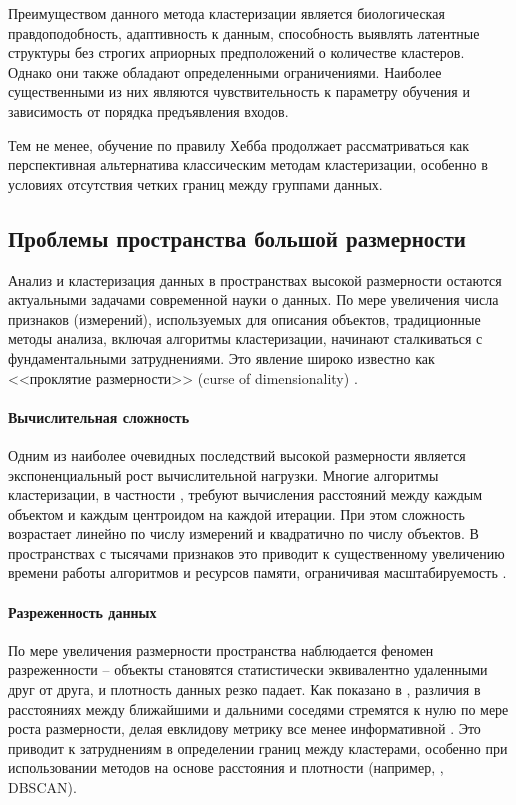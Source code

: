         Преимуществом данного метода кластеризации является биологическая правдоподобность, адаптивность к данным, способность выявлять латентные структуры без строгих априорных предположений о количестве кластеров. Однако они также обладают определенными ограничениями. Наиболее существенными из них являются чувствительность к параметру обучения и зависимость от порядка предъявления входов.

        Тем не менее, обучение по правилу Хебба продолжает рассматриваться как перспективная альтернатива классическим методам кластеризации, особенно в условиях отсутствия четких границ между группами данных.


    \subsection{Проблемы пространства большой размерности}
        Анализ и кластеризация данных в пространствах высокой размерности остаются актуальными задачами современной науки о данных. По мере увеличения числа признаков (измерений), используемых для описания объектов, традиционные методы анализа, включая алгоритмы кластеризации, начинают сталкиваться с фундаментальными затруднениями. Это явление широко известно как <<проклятие размерности>> (curse of dimensionality) \cite{Bellman1957cursedim}.

        \paragraph{Вычислительная сложность}
            Одним из наиболее очевидных последствий высокой размерности является экспоненциальный рост вычислительной нагрузки. Многие алгоритмы кластеризации, в частности \kmeans{}, требуют вычисления расстояний между каждым объектом и каждым центроидом на каждой итерации. При этом сложность возрастает линейно по числу измерений и квадратично по числу объектов. В пространствах с тысячами признаков это приводит к существенному увеличению времени работы алгоритмов и ресурсов памяти, ограничивая масштабируемость \cite{Verleysen2005curse}.

        \paragraph{Разреженность данных}
            По мере увеличения размерности пространства наблюдается феномен разреженности -- объекты становятся статистически эквивалентно удаленными друг от друга, и плотность данных резко падает. Как показано в \cite{Beyer1999NearestNeighbor}, различия в расстояниях между ближайшими и дальними соседями стремятся к нулю по мере роста размерности, делая евклидову метрику все менее информативной \cite{aggarwal2001surprising}. Это приводит к затруднениям в определении границ между кластерами, особенно при использовании методов на основе расстояния и плотности (например, \kmeans{}, DBSCAN).

